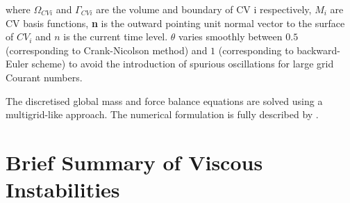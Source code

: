 \documentclass[preprint,authoryear,12pt]{elsarticle}
\newcommand{\ie}{{\it i.e., }}
\begin{document}
 

\noindent
where $\Omega_{CVi}$ and $\Gamma_{CVi}$ are the volume and boundary of CV i respectively, $M_{i}$ are CV basis functions, \textbf{n} is the outward pointing unit normal vector to the surface of $CV_{i}$ and $n$ is the current time level. $\theta$ varies smoothly between $0.5$ (corresponding to Crank-Nicolson method) and $1$ (corresponding to backward-Euler scheme) to avoid the introduction of spurious oscillations for large grid Courant numbers.

The discretised global mass and force balance equations are solved using a multigrid-like approach. The numerical formulation is fully described by \citet{gomes_2017} \citep[see also][]{salinas2015,salinas_2018,adam_2016}. 

\section{Brief Summary of Viscous Instabilities}\label{section:ViscousInstabilities}
\end{document}

